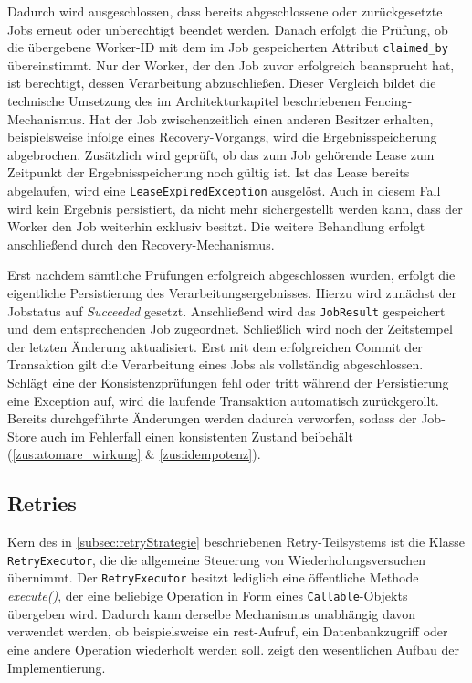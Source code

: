 Dadurch wird ausgeschlossen, dass bereits abgeschlossene oder zurückgesetzte Jobs erneut oder unberechtigt beendet werden.
Danach erfolgt die Prüfung, ob die übergebene Worker-ID mit dem im Job gespeicherten Attribut \texttt{claimed\_by} übereinstimmt.
Nur der Worker, der den Job zuvor erfolgreich beansprucht hat, ist berechtigt, dessen Verarbeitung abzuschließen.
Dieser Vergleich bildet die technische Umsetzung des im Architekturkapitel beschriebenen Fencing-Mechanismus.
Hat der Job zwischenzeitlich einen anderen Besitzer erhalten, beispielsweise infolge eines Recovery-Vorgangs, wird die Ergebnisspeicherung abgebrochen.
Zusätzlich wird geprüft, ob das zum Job gehörende Lease zum Zeitpunkt der Ergebnisspeicherung noch gültig ist.
Ist das Lease bereits abgelaufen, wird eine \texttt{LeaseExpiredException} ausgelöst.
Auch in diesem Fall wird kein Ergebnis persistiert, da nicht mehr sichergestellt werden kann, dass der Worker den Job weiterhin exklusiv besitzt.
Die weitere Behandlung erfolgt anschließend durch den Recovery-Mechanismus.

Erst nachdem sämtliche Prüfungen erfolgreich abgeschlossen wurden, erfolgt die eigentliche Persistierung des Verarbeitungsergebnisses.
Hierzu wird zunächst der Jobstatus auf \textit{Succeeded} gesetzt.
Anschließend wird das \texttt{JobResult} gespeichert und dem entsprechenden Job zugeordnet.
Schließlich wird noch der Zeitstempel der letzten Änderung aktualisiert.
Erst mit dem erfolgreichen Commit der Transaktion gilt die Verarbeitung eines Jobs als vollständig abgeschlossen.
Schlägt eine der Konsistenzprüfungen fehl oder tritt während der Persistierung eine Exception auf, wird die laufende
Transaktion automatisch zurückgerollt.
Bereits durchgeführte Änderungen werden dadurch verworfen, sodass der Job-Store auch im Fehlerfall einen konsistenten
Zustand beibehält (\ref{zus:atomare_wirkung} \& \ref{zus:idempotenz}).

\subsection{Retries}
\label{subsec:impl_retries}
Kern des in \cref{subsec:retryStrategie} beschriebenen Retry-Teilsystems ist die Klasse \texttt{RetryExecutor},
die die allgemeine Steuerung von Wiederholungsversuchen übernimmt.
Der \texttt{RetryExecutor} besitzt lediglich eine öffentliche Methode \textit{execute()}, der eine beliebige Operation in Form
eines \texttt{Callable}-Objekts übergeben wird.
Dadurch kann derselbe Mechanismus unabhängig davon verwendet werden, ob beispielsweise ein \gls{rest}-Aufruf, ein Datenbankzugriff
oder eine andere Operation wiederholt werden soll.
 zeigt den wesentlichen Aufbau der Implementierung.

